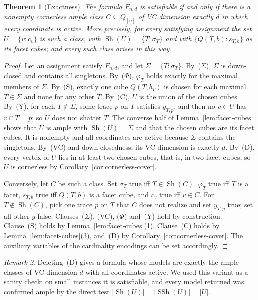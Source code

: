 \documentclass[11pt]{article}
\numberwithin{equation}{section}
\newtheorem{theorem}{Theorem}[section]
\theoremstyle{definition}
\theoremstyle{remark}
\newtheorem{remark}[theorem]{Remark}
\newcommand{\Sh}{\operatorname{Sh}}
\newcommand{\SSh}{\operatorname{SSh}}
\begin{document}
\begin{theorem}[Exactness]
\label{thm:encoding}
The formula \(F_{n,d}\) is satisfiable if and only if there is a nonempty
cornerless ample class \(C\subseteq Q_{[n]}\) of VC dimension exactly
\(d\) in which every coordinate is active.  More precisely, for every
satisfying assignment the set \(U=\{v:c_v\}\) is such a class, with
\(\Sh(U)=\{T:\sigma_T\}\) and with \(\{Q(T,b):s_{T,b}\}\) as its facet
cubes; and every such class arises in this way.
\end{theorem}

\begin{proof}
Let an assignment satisfy \(F_{n,d}\), and let
\(\Sigma=\{T:\sigma_T\}\).  By~(\(\Sigma\)), \(\Sigma\) is down-closed and contains
all singletons.  By~(\(\Phi\)), \(\varphi_T\) holds exactly for the maximal
members of \(\Sigma\).  By~(S), exactly one cube \(Q(T,b_T)\) is chosen
for each maximal \(T\in\Sigma\) and none for any other \(T\).  By~(C), \(U\)
is the union of the chosen cubes.  By~(Y), for each \(T\notin\Sigma\),
some trace \(p\) on \(T\) satisfies \(y_{T,p}\), and then no \(v\in U\)
has \(v\cap T=p\); so \(U\) does not shatter \(T\).  The converse half of
Lemma~\ref{lem:facet-cubes} shows that \(U\) is ample with
\(\Sh(U)=\Sigma\) and that the chosen cubes are its facet cubes.  It is
nonempty and all coordinates are active because \(\Sigma\) contains the
singletons.  By~(VC) and down-closedness, its VC dimension is exactly
\(d\).  By~(D), every vertex of \(U\) lies in at least two chosen cubes,
that is, in two facet cubes, so \(U\) is cornerless by
Corollary~\ref{cor:cornerless-cover}.

Conversely, let \(C\) be such a class.  Set \(\sigma_T\) true iff
\(T\in\Sh(C)\), \(\varphi_T\) true iff \(T\) is a facet, \(s_{T,b}\) true iff
\(Q(T,b)\) is a facet cube, and \(c_v\) true iff \(v\in C\).  For
\(T\notin\Sh(C)\), pick one trace \(p\) on \(T\) that \(C\) does not
realize and set \(y_{T,p}\) true; set all other \(y\) false.  Clauses~(\(\Sigma\)),
(VC), (\(\Phi\)) and~(Y) hold by construction.  Clause~(S) holds by
Lemma~\ref{lem:facet-cubes}(1).  Clause~(C) holds by
Lemma~\ref{lem:facet-cubes}(3), and~(D) by
Corollary~\ref{cor:cornerless-cover}.  The auxiliary variables of the
cardinality encodings can be set accordingly.
\end{proof}

\begin{remark}
Deleting~(D) gives a formula whose models are exactly the ample classes of
VC dimension \(d\) with all coordinates active.  We used this variant as a
sanity check: on small instances it is satisfiable, and every model
returned was confirmed ample by the direct test \(|\Sh(U)|=|\SSh(U)|=|U|\).
\end{remark}
\end{document}
